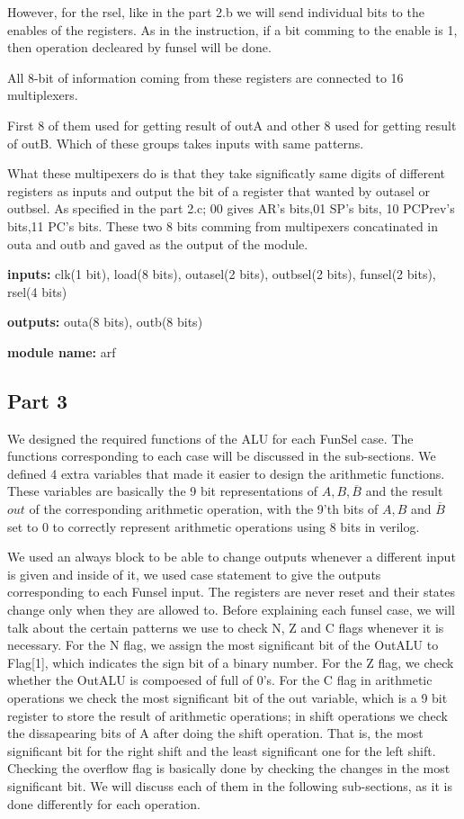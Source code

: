 \documentclass[pdftex,12pt,a4paper]{article}
\begin{document}
However, for the rsel, like in the part 2.b we will send individual bits to the enables of
the registers. As in the instruction, if a bit comming to the enable is 1, then operation
decleared by funsel will be done.

All 8-bit of information coming from these registers are connected to 16 multiplexers.

First 8 of them used for getting result of outA and other 8 used for getting result of 
outB. Which of these groups takes inputs with same patterns.

What these multipexers do is that they take significatly same digits of different registers 
as inputs and output the bit of a register that wanted by outasel or outbsel. As specified
in the part 2.c; 00 gives AR's bits,01 SP's bits, 10 PCPrev's bits,11 PC's bits. 
These two 8 bits comming from multipexers concatinated in outa and outb and gaved as
the output of the module.

\textbf{inputs:}    clk(1 bit),
load(8 bits),
outasel(2 bits),
outbsel(2 bits),
funsel(2 bits),
rsel(4 bits)

\textbf{outputs:}    
outa(8 bits),
outb(8 bits)

\textbf{module name:} arf

\subsection{Part 3}
We designed the required functions of the ALU for each FunSel case. The functions corresponding to each case will be discussed in the
sub-sections. We defined 4 extra variables that made it easier to design the arithmetic functions. These variables are basically the 9 
bit representations of $A, B, \overline{B}$ and the result $out$ of the corresponding arithmetic operation, with the 9'th bits of 
$A, B$ and $\overline{B}$ set to 0 to correctly represent arithmetic operations using 8 bits in verilog. 

We used an always block to be able to change outputs whenever a different input is given and inside of it, we used case statement to
give the outputs corresponding to each Funsel input. The registers are never reset and their states change only when they are allowed
to. 
\newline
Before explaining each funsel case, we will talk about the certain patterns we use to check N, Z and C flags whenever it is necessary. 
For the N flag, we assign the most significant bit of the OutALU to Flag[1], which indicates the sign bit of a binary number. 
For the Z flag, we check whether the OutALU is compoesed of full of 0's. For the C flag in arithmetic operations we check the most 
significant bit of the out variable, which is a 9 bit register to store the result of arithmetic operations; in shift operations we 
check the dissapearing bits of A after doing the shift operation. That is, the most significant bit for the right shift and the 
least significant one for the left shift. 
Checking the overflow flag is basically done by checking the changes in the most significant bit. We will discuss each of them
in the following sub-sections, as it is done differently for each operation. 
\end{document}
